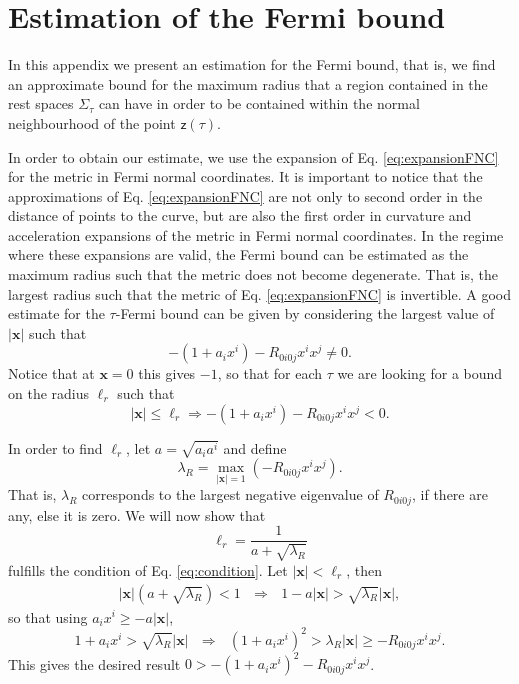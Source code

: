 \documentclass[letterpaper,12pt,titlepage,oneside,final]{book}
\newcommand{\mf}{\mathsf}%
\begin{document}
\chapter{Estimation of the Fermi bound}\label{app:fermi}

In this appendix we present an estimation for the Fermi bound, that is, we find an approximate bound for the maximum radius that a region contained in the rest spaces $\Sigma_\tau$ can have in order to be contained within the normal neighbourhood of the point $\mf z(\tau)$.

In order to obtain our estimate, we use the expansion of Eq. \eqref{eq:expansionFNC} for the
metric in Fermi normal coordinates. It is important to notice that the approximations of Eq. \eqref{eq:expansionFNC} are not only to second order in the distance of points to the curve, but are also the first order in curvature and acceleration expansions of the metric in Fermi normal coordinates. In the regime where these expansions are valid, the Fermi bound can be estimated as the maximum radius such that the metric does not become degenerate. That is, the largest radius such that the metric of Eq. \eqref{eq:expansionFNC}
is invertible. A good estimate for the $\tau$-Fermi bound can be given by considering the largest value of $|\bm x|$ such that 
\begin{equation}
    -(1+a_i x^i) - R_{0i0j}x^ix^j \neq 0.
\end{equation}
Notice that at $\bm x = 0$ this gives $-1$, so that for each $\tau$ we are looking for a bound on the radius $\ell_r$ such that 
\begin{equation}\label{eq:condition}
    |\bm x| \leq \ell_r \Rightarrow -(1+a_i x^i) - R_{0i0j}x^ix^j < 0. 
\end{equation}

In order to find $\ell_r$, let $a = \sqrt{a_ia^i}$ and define
\begin{equation}
    \lambda_R = \max_{|\bm x| = 1}\left(-R_{0i0j}x^ix^j\right).
\end{equation}
That is, $\lambda_R$ corresponds to the largest negative eigenvalue of $R_{0i0j}$, if there are any, else it is zero. We will now show that
\begin{equation}
    \ell_r = \frac{1}{a+\sqrt{\lambda_R}}
\end{equation}
fulfills the condition of Eq. \eqref{eq:condition}. Let $|\bm x|<\ell_r$, then
\begin{align}
    |\bm x|(a + \sqrt{\lambda_R})<1 \:\:\:\Rightarrow\:\:\: 1 - a|\bm x| >\sqrt{\lambda_R}|\bm x|,
\end{align}
so that using $a_i x^i \geq -a |\bm x|$,
\begin{equation}\label{eq:noname}
    1 + a_i x^i> \sqrt{\lambda_R} |\bm x| \:\:\:\Rightarrow\:\:\: (1 + a_i x^i)^2 > \lambda_R |\bm x| \geq - R_{0i0j}x^i x^j.
\end{equation}
This gives the desired result $0>-(1 + a_i x^i)^2- R_{0i0j}x^i x^j$.
\end{document}
